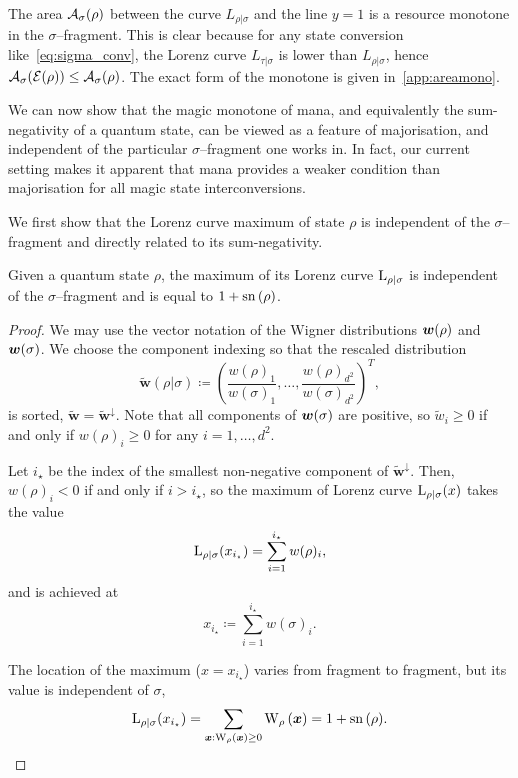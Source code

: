 \documentclass[pra,
aps,
twocolumn,
superscriptaddress,
groupedaddress,
nofootinbib,
reprint
]{revtex4-1}
\begin{document}
The area ${\mathcal A}_\sigma(\rho)$ between the curve $L_{\rho|\sigma}$ and the line $y=1$ is a resource monotone in the $\sigma$--fragment. 
This is clear because for any state conversion like~\cref{eq:sigma_conv}, the Lorenz curve $L_{\tau|\sigma}$ is lower than $L_{\rho|\sigma}$, hence ${\mathcal A}_\sigma(\mathcal{E}(\rho)) \leq {\mathcal A}_\sigma(\rho)$.
The exact form of the monotone is given in~\cref{app:areamono}.

We can now show that the magic monotone of mana, and equivalently the sum-negativity of a quantum state, can be viewed as a feature of majorisation, and independent of the particular $\sigma$--fragment one works in.
In fact, our current setting makes it apparent that mana provides a weaker condition than majorisation for all magic state interconversions.

We first show that the Lorenz curve maximum of state $\rho$ is independent of the $\sigma$--fragment and directly related to its sum-negativity.
\begin{lemma}\label{lem:lcmax}
	Given a quantum state $\rho$, the maximum of its Lorenz curve ${{\rm{L}}_{\rho|\sigma}}$ is independent of the $\sigma$--fragment and is equal to $1+{{\rm{sn}}\left(\rho\right)}$.
\end{lemma}
\begin{proof}
	We may use the vector notation of the Wigner distributions $\bm{w}(\rho)$ and $\bm{w}(\sigma)$.
	We choose the component indexing so that the rescaled distribution 
	\begin{equation}
		\widetilde{\bm{w}}(\rho|\sigma) \coloneqq \left(\frac{w(\rho)_1}{w(\sigma)_1}, \dots, \frac{w(\rho)_{d^2}}{w(\sigma)_{d^2}} \right)^T,
	\end{equation}
	is sorted, $\widetilde{\bm{w}} = \widetilde{\bm{w}}^\downarrow$.
	Note that all components of $\bm{w}(\sigma)$ are positive, so $\widetilde{w}_i \geq 0$ if and only if $w(\rho)_i \geq 0$ for any $i=1,\dots,d^2$.
	
	Let $i_\star$ be the index of the smallest non-negative component of $\widetilde{\bm{w}}^\downarrow$.
	Then, $w(\rho)_i < 0$ if and only if $i > i_\star$, so the maximum of Lorenz curve ${{\rm{L}}_{\rho|\sigma}}(x)$ takes the value 
	\begin{equation}
		{{\rm{L}}_{\rho|\sigma}}(x_{i_\star}) = \sum_{i=1}^{i_\star} w(\rho)_i,
	\end{equation}
	and is achieved at
	\begin{equation}\label{eq:maxloc}
		x_{i_\star} \coloneqq \sum_{i=1}^{i_\star} w(\sigma)_i.
	\end{equation}

	The location of the maximum ($x=x_{i_\star}$) varies from fragment to fragment, but its value is independent of $\sigma$,
	\begin{equation}
		\lc{\rho}{\sigma}(x_{i_\star})
		= \sum\limits_{\bmx: \W[\bmx]{\rho} \geq 0} \W[\bmx]{\rho}
		= 1 + \sn{\rho}.
	\end{equation}
	
\end{proof}
\end{document}
